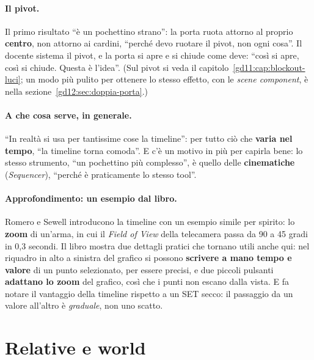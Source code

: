 \paragraph{Il pivot.} Il primo risultato ``è un pochettino strano'': la porta
ruota attorno al proprio \textbf{centro}, non attorno ai cardini, ``perché devo
ruotare il pivot, non ogni cosa''. Il docente sistema il pivot, e la porta si
apre e si chiude come deve: ``così si apre, così si chiude. Questa è l'idea''.
(Sul pivot si veda il capitolo~\ref{gd11:cap:blockout-luci}; un modo più pulito
per ottenere lo stesso effetto, con le \emph{scene component}, è nella
sezione~\ref{gd12:sec:doppia-porta}.)

\paragraph{A che cosa serve, in generale.} ``In realtà si usa per tantissime
cose la timeline'': per tutto ciò che \textbf{varia nel tempo}, ``la timeline
torna comoda''. E c'è un motivo in più per capirla bene: lo stesso strumento,
``un pochettino più complesso'', è quello delle \textbf{cinematiche}
(\emph{Sequencer}), ``perché è praticamente lo stesso tool''.

\paragraph{Approfondimento: un esempio dal libro.} Romero e Sewell introducono
la timeline con un esempio simile per spirito: lo \textbf{zoom} di un'arma,
in cui il \emph{Field of View} della telecamera passa da 90 a 45 gradi in 0,3
secondi. Il libro mostra due dettagli pratici che tornano utili anche qui: nel
riquadro in alto a sinistra del grafico si possono \textbf{scrivere a mano
tempo e valore} di un punto selezionato, per essere precisi, e due piccoli
pulsanti \textbf{adattano lo zoom} del grafico, così che i punti non escano
dalla vista. E fa notare il vantaggio della timeline rispetto a un SET secco:
il passaggio da un valore all'altro è \emph{graduale}, non uno scatto.

\section{Relative e world}
\label{gd12:sec:relative}

